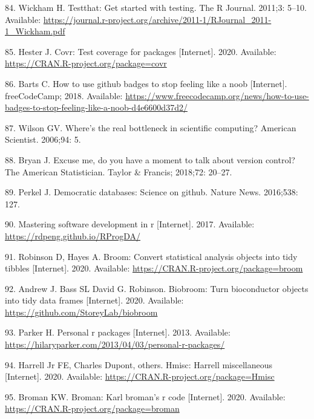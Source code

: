 \documentclass[10pt,letterpaper]{article}
\begin{document}
\leavevmode\hypertarget{ref-testthat}{}%
84. Wickham H. Testthat: Get started with testing. The R Journal.
2011;3: 5--10. Available:
\url{https://journal.r-project.org/archive/2011-1/RJournal_2011-1_Wickham.pdf}

\leavevmode\hypertarget{ref-covr}{}%
85. Hester J. Covr: Test coverage for packages {[}Internet{]}. 2020.
Available: \url{https://CRAN.R-project.org/package=covr}

\leavevmode\hypertarget{ref-barts2018}{}%
86. Barts C. How to use github badges to stop feeling like a noob
{[}Internet{]}. freeCodeCamp; 2018. Available:
\url{https://www.freecodecamp.org/news/how-to-use-badges-to-stop-feeling-like-a-noob-d4e6600d37d2/}

\leavevmode\hypertarget{ref-wilson2006}{}%
87. Wilson GV. Where's the real bottleneck in scientific computing?
American Scientist. 2006;94: 5.

\leavevmode\hypertarget{ref-bryan2018}{}%
88. Bryan J. Excuse me, do you have a moment to talk about version
control? The American Statistician. Taylor \& Francis; 2018;72: 20--27.

\leavevmode\hypertarget{ref-perkel2016}{}%
89. Perkel J. Democratic databases: Science on github. Nature News.
2016;538: 127.

\leavevmode\hypertarget{ref-peng2017}{}%
90. Mastering software development in r {[}Internet{]}. 2017. Available:
\url{https://rdpeng.github.io/RProgDA/}

\leavevmode\hypertarget{ref-broom}{}%
91. Robinson D, Hayes A. Broom: Convert statistical analysis objects
into tidy tibbles {[}Internet{]}. 2020. Available:
\url{https://CRAN.R-project.org/package=broom}

\leavevmode\hypertarget{ref-biobroom}{}%
92. Andrew J. Bass SL David G. Robinson. Biobroom: Turn bioconductor
objects into tidy data frames {[}Internet{]}. 2020. Available:
\url{https://github.com/StoreyLab/biobroom}

\leavevmode\hypertarget{ref-parker2013}{}%
93. Parker H. Personal r packages {[}Internet{]}. 2013. Available:
\url{https://hilaryparker.com/2013/04/03/personal-r-packages/}

\leavevmode\hypertarget{ref-Hmisc}{}%
94. Harrell Jr FE, Charles Dupont, others. Hmisc: Harrell miscellaneous
{[}Internet{]}. 2020. Available:
\url{https://CRAN.R-project.org/package=Hmisc}

\leavevmode\hypertarget{ref-broman}{}%
95. Broman KW. Broman: Karl broman's r code {[}Internet{]}. 2020.
Available: \url{https://CRAN.R-project.org/package=broman}
\end{document}
